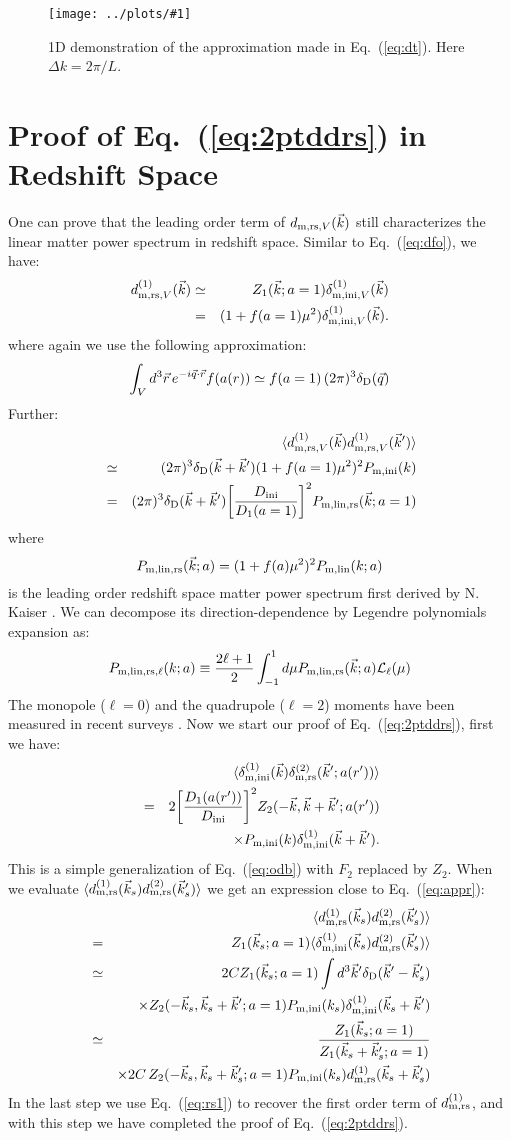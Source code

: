 \documentclass[prd,amsmath,amssymb,floatfix,superscriptaddress,nofootinbib,twocolumn]{revtex4-1}
\def\be{\begin{equation}}
\def\ee{\end{equation}}
\def\bea{\begin{eqnarray}}
\def\eea{\end{eqnarray}}
\newcommand{\rs}{\rm rs}
\newcommand{\ini}{\rm ini}
\newcommand{\vrr}{\vec{r}}
\newcommand{\vs}{\nonumber\\}
\newcommand{\vk}{\vec{k}}
\newcommand{\ec}[1]{Eq.~(\ref{eq:#1})}
\newcommand{\eql}[1]{\label{eq:#1}}
\newcommand{\sfig}[2]{
\texttt{[image: ../plots/\#1]}
        }
\newcommand{\Sfig}[2]{
   \begin{figure}[thbp]
   \begin{center}
    \sfig{../plots/#1.pdf}{\columnwidth}
    \caption{{\small #2}}
    \label{fig:#1}
     \end{center}
   \end{figure}
}
\begin{document}
\Sfig{approx}{1D demonstration of the approximation made in \ec{dt}. Here $\Delta k=2\pi /L$.}

\section{Proof of \ec{2ptddrs} in Redshift Space} \label{appendb}
One can prove that the leading order term of $d_{{\rm m,rs},V}(\vk)$ still characterizes the linear matter power spectrum in redshift space. Similar to \ec{dfo}, we have:
\bea
d^{( 1)}_{{\rm m,rs},V}(\vk)&\simeq & Z_{1}(\vk;a=1)\delta^{(1)}_{{\rm m,ini},V}(\vk)\vs
&=&(1+f(a=1)\mu^2)\delta^{(1)}_{{\rm m,ini},V}(\vk).\eql{rs1}
\eea
where again we use the following approximation:
\be 
\int_{V} d^{3}\vrr\, e^{-i\vec{q}\cdot\vrr}f(a(r))  \simeq f(a=1)\,(2\pi)^3\delta_{\rm D}(\vec{q})
\ee 
Further:
\bea 
&&\langle d^{( 1)}_{{\rm m,rs},V}(\vk) d^{(1)}_{{\rm m,rs},V}(\vk') \rangle\vs
& \simeq&(2\pi)^3 \delta_{\rm D}(\vk+\vk')(1+f(a=1)\mu^2)^2 P_{\rm m,ini}(k)\vs
&= &(2\pi)^3 \delta_{\rm D}(\vk+\vk')\bigg[ \frac{D_{\ini}}{D_1(a=1)}\bigg]^2 P_{\rm m,lin,rs}(\vk;a=1)\vs \eql{lpsrs}
\eea 
where 
\be 
P_{\rm m,lin,rs}(\vk;a)=(1+f(a)\mu^2)^2 P_{\rm m,lin}(k;a) \eql{kaiser}
\ee 
is the leading order redshift space matter power spectrum first derived by N. Kaiser \cite{Kaiser:1987rsd}. We can decompose its direction-dependence by Legendre polynomials expansion as:
\be 
P_{\rm m,lin,rs,\ell}(k;a)\equiv \frac{2\ell+1}{2}\int_{-1}^{1}d\mu P_{\rm m,lin,rs}(\vk;a) \mathcal{L}_{\ell}(\mu)
\ee 
The monopole ($\ell=0$) and the quadrupole ($\ell=2$) moments have been measured in recent surveys \cite{Gil-Marin:2015sqa}. Now we start our proof of \ec{2ptddrs}, first we have:
\bea 
&&\langle \dmi^{(1)}(\vk)\delta_{\rm m,\rs}^{(2)}(\vk';a(r'))\rangle\vs 
&=&2\bigg[\frac{D_{1}(a(r'))}{D_{\ini}} \bigg]^{2}Z_{2}(-\vk,\vk+\vk';a(r')) \vs
& &\times P_{\rm m,\ini}(k)\dmi^{(1)}(\vk+\vk').\vs
\eea 
This is a simple generalization of \ec{odb} with $F_2$ replaced by $Z_2$. When we evaluate $\langle d_{\rm m,\rs}^{(1)}(\vk_s) d_{\rm m,\rs}^{(2)}(\vk'_s)\rangle$ we get an expression close to \ec{appr}:
\bea 
&& \langle d^{(1)}_{\rm m,\rs}(\vk_s)d^{(2)}_{\rm m,\rs}(\vk_s') \rangle \vs 
&=&  Z_{1}(\vk_s;a=1)\langle \dmi^{(1)}(\vk_s)d^{(2)}_{\rm m,\rs}(\vk_s') \rangle\vs
&\simeq &2CZ_{1}(\vk_s;a=1)\int {d^{3}\vk'}\delta_{\rm D}(\vk'-\vk_s') \vs
&&\times Z_{2}(-\vk_s,\vk_s+\vk';a=1)P_{\rm m,\ini}(k_s)\dmi^{(1)}(\vk_s+\vk') \vs
&\simeq & \frac{Z_{1}(\vk_s;a=1 )}{Z_{1}(\vk_s+\vk_s';a=1)} \vs 
&&\times2C\,Z_{2}(-\vk_s,\vk_s+\vk_s';a=1) P_{\rm m,\ini}(k_s)d_{\rm m,rs}^{(1)}(\vk_s+\vk_s') \vs\eql{apprrs}
\eea 
In the last step we use \ec{rs1} to recover the first order term of $d_{\rm m,rs}^{(1)}$, and with this step we have completed the proof of \ec{2ptddrs}.
\end{document}
